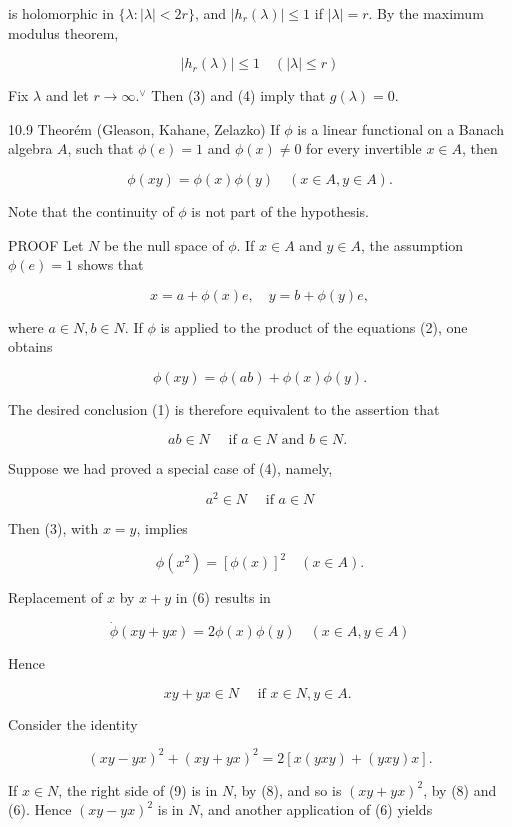 \documentclass[10pt]{article}
\begin{document}
is holomorphic in $\{\lambda:|\lambda|<2 r\}$, and $\left|h_{r}(\lambda)\right| \leq 1$ if $|\lambda|=r$. By the maximum modulus theorem,

$$
\left|h_{r}(\lambda)\right| \leq 1 \quad(|\lambda| \leq r)
$$

Fix $\lambda$ and let $r \rightarrow \infty .^{\vee}$ Then (3) and (4) imply that $g(\lambda)=0$.

10.9 Theorém (Gleason, Kahane, Zelazko) If $\phi$ is a linear functional on a Banach algebra $A$, such that $\phi(e)=1$ and $\phi(x) \neq 0$ for every invertible $x \in A$, then

$$
\phi(x y)=\phi(x) \phi(y) \quad(x \in A, y \in A) .
$$

Note that the continuity of $\phi$ is not part of the hypothesis.

PROOF Let $N$ be the null space of $\phi$. If $x \in A$ and $y \in A$, the assumption $\phi(e)=1$ shows that

$$
x=a+\phi(x) e, \quad y=b+\phi(y) e,
$$

where $a \in N, b \in N$. If $\phi$ is applied to the product of the equations (2), one obtains

$$
\phi(x y)=\phi(a b)+\phi(x) \phi(y) .
$$

The desired conclusion (1) is therefore equivalent to the assertion that

$$
a b \in N \quad \text { if } a \in N \text { and } b \in N \text {. }
$$

Suppose we had proved a special case of (4), namely,

$$
a^{2} \in N \quad \text { if } a \in N
$$

Then (3), with $x=y$, implies

$$
\phi\left(x^{2}\right)=[\phi(x)]^{2} \quad(x \in A) .
$$

Replacement of $x$ by $x+y$ in (6) results in

$$
\dot{\phi}(x y+y x)=2 \phi(x) \phi(y) \quad(x \in A, y \in A)
$$

Hence

$$
x y+y x \in N \quad \text { if } x \in N, y \in A \text {. }
$$

Consider the identity

$$
(x y-y x)^{2}+(x y+y x)^{2}=2[x(y x y)+(y x y) x] .
$$

If $x \in N$, the right side of (9) is in $N$, by (8), and so is $(x y+y x)^{2}$, by (8) and (6). Hence $(x y-y x)^{2}$ is in $N$, and another application of (6) yields
\end{document}
